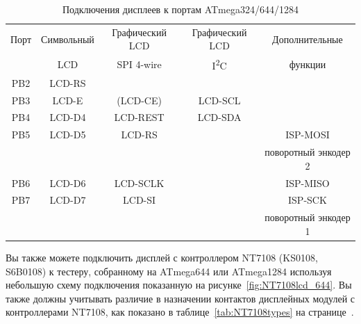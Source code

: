 \begin{table}[H]
  \begin{center}
    \begin{tabular}{| c || c | c | c | c |}
    \hline
      Порт & Символьный & Графический LCD & Графический LCD & Дополнительные\\
	   &     LCD    &   SPI 4-wire &   I\textsuperscript{2}C      &  функции \\
    \hline
    \hline
    PB2    &  LCD-RS         &            &          &       \\
    \hline                                              
    PB3    &  LCD-E          &  (LCD-CE)  &  LCD-SCL &       \\
    \hline                                              
    PB4    &  LCD-D4         &  LCD-REST  &  LCD-SDA &       \\
    \hline                                              
    PB5    &  LCD-D5         &  LCD-RS    &          & ISP-MOSI \\
           &                 &            &          & поворотный энкодер 2 \\
    \hline                                              
    PB6    &  LCD-D6         &  LCD-SCLK  &          & ISP-MISO \\
    \hline                                            
    PB7    &  LCD-D7         &  LCD-SI    &          & ISP-SCK  \\
           &                 &            &          & поворотный энкодер 1 \\
    \hline
    \end{tabular}
  \end{center}
  \caption{Подключения дисплеев к портам ATmega324/644/1284}
  \label{tab:mega644-display}
\end{table}

Вы также можете подключить дисплей с контроллером NT7108 (KS0108, S6B0108) к тестеру, собранному на ATmega644 или ATmega1284
используя небольшую схему подключения показанную на рисунке~\ref{fig:NT7108lcd_644}.
Вы также должны учитывать различие в назначении контактов дисплейных модулей с контроллерами NT7108, 
как показано в таблице~\ref{tab:NT7108types} на странице~\pageref{tab:NT7108types}.

